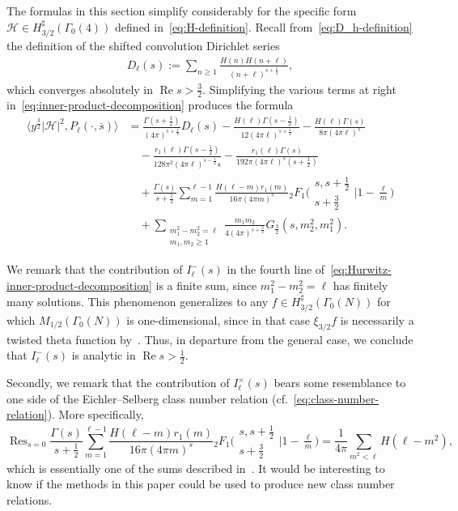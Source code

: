 \documentclass[11pt,reqno]{amsart}
\theoremstyle{plain}
\theoremstyle{definition}
\numberwithin{equation}{section}
\renewcommand{\Re}{\operatorname{Re}}
\DeclareMathOperator*{\Res}{Res}
\begin{document}
The formulas in this section simplify considerably for the specific form $\mathcal{H} \in H_{3/2}^\sharp(\Gamma_0(4))$ defined in~\eqref{eq:H-definition}. Recall from~\eqref{eq:D_h-definition} the definition of the shifted convolution Dirichlet series
\begin{align} \label{eq:D_h-definition-redux}
	D_\ell(s) :=
		\sum_{n \geq 1} \frac{H(n) H(n+\ell)}{(n+\ell)^{s+\frac{1}{2}}},
\end{align}
which converges absolutely in $\Re s > \frac{3}{2}$. Simplifying the various terms at right in~\eqref{eq:inner-product-decomposition} produces the formula
\begin{align} \label{eq:Hurwitz-inner-product-decomposition}
\nonumber
\langle y^{\frac{3}{2}} \vert \mathcal{H} \vert^2, P_\ell(\cdot, \overline{s}) \rangle 
	&= \frac{\Gamma(s+\tfrac{1}{2})}{(4\pi)^{s+\frac{1}{2}}}
		D_\ell(s)
		 - \frac{H(\ell)\Gamma(s-\frac{1}{2})}{12 (4\pi \ell)^{s+\frac{1}{2}}} 
	   - \frac{H(\ell)\Gamma(s)}{8\pi (4\pi \ell)^s} \\
	& \quad
		- \frac{r_1(\ell) \Gamma(s-\frac{1}{2})}{128 \pi^{2} (4\pi \ell)^{s-\frac{1}{2}} s}
		- \frac{r_1(\ell) \Gamma(s)}{192 \pi (4\pi \ell)^{s} (s+\frac{1}{2})} \\
	& \quad
		+ \frac{\Gamma(s)}{s+\frac{1}{2}} 
		\sum_{m=1}^{\ell-1} \frac{H(\ell-m)  r_1(m)}{16 \pi (4\pi m)^{s}} 
		{}_2F_1\Big(\begin{matrix} s, s+\frac{1}{2} \\ s+\frac{3}{2} \end{matrix}
					\Big\vert 1-\frac{\ell}{m} \Big) \\
	& \quad + \sum_{\substack{m_1^2 - m_2^2 =\ell \\ m_1,m_2 \geq 1}}
		\frac{m_1 m_2}{4 (4\pi)^{s+\frac{3}{2}}} G_\frac{3}{2}(s,m_2^2, m_1^2).
\end{align}

We remark that the contribution of $I_\ell^-(s)$ in the fourth line of~\eqref{eq:Hurwitz-inner-product-decomposition} is a finite sum, since $m_1^2 - m_2^2 = \ell$ has finitely many solutions. This phenomenon generalizes to any $f \in H_{3/2}^\sharp(\Gamma_0(N))$ for which $M_{1/2}(\Gamma_0(N))$ is one-dimensional, since in that case $\xi_{3/2} f$ is necessarily a twisted theta function by~\cite[Theorem A]{SerreStark77}.
Thus, in departure from the general case, we conclude that $I_\ell^-(s)$ is analytic in $\Re s > \frac{1}{2}$.

Secondly, we remark that the contribution of $I_\ell^\times(s)$ bears some resemblance to one side of the Eichler--Selberg class number relation (cf.~\eqref{eq:class-number-relation}). More specifically,
\[
	\Res_{s=0} \frac{\Gamma(s)}{s+\frac{1}{2}} 
		\sum_{m=1}^{\ell-1} \frac{H(\ell-m)  r_1(m)}{16 \pi (4\pi m)^{s}} 
		{}_2F_1\Big(\begin{matrix} s, s+\frac{1}{2} \\ s+\frac{3}{2} \end{matrix}
		\Big\vert 1-\tfrac{\ell}{m} \Big) 
	=
	 \frac{1}{4\pi} \! \sum_{m^2 < \ell} H(\ell-m^2),
\]
which is essentially one of the sums described in~\cite[\S{10.3}]{BFOR19}. It would be interesting to know if the methods in this paper could be used to produce new class number relations.
\end{document}
